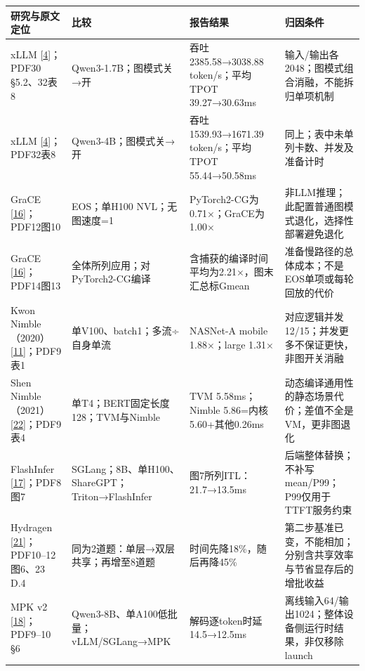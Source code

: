 \documentclass[
  11pt,
  UTF8]{ctexart}
\begin{document}
\begin{longtable}[]{@{}
  >{\raggedright\arraybackslash}p{}
  >{\raggedright\arraybackslash}p{}
  >{\raggedright\arraybackslash}p{}
  >{\raggedright\arraybackslash}p{}@{}}
\toprule
研究与原文定位 & 比较 & 报告结果 & 归因条件 \\
\midrule
\endhead
xLLM {[}\protect\hyperlink{ref-liu2025xllm}{4}{]}；PDF30 §5.2、32表8 &
Qwen3-1.7B；图模式关→开 & 吞吐2385.58→3038.88 token/s；平均TPOT
39.27→30.63ms & 输入/输出各2048；图模式组合消融，不能拆归单项机制 \\
xLLM {[}\protect\hyperlink{ref-liu2025xllm}{4}{]}；PDF32表8 &
Qwen3-4B；图模式关→开 & 吞吐1539.93→1671.39 token/s；平均TPOT
55.44→50.58ms & 同上；表中未单列卡数、并发及准备计时 \\
GraCE {[}\protect\hyperlink{ref-ghosh2026grace}{16}{]}；PDF12图10 &
EOS；单H100 NVL；无图速度=1 & PyTorch2-CG为0.71×；GraCE为1.00× &
非LLM推理；此配置普通图模式退化，选择性部署避免退化 \\
GraCE {[}\protect\hyperlink{ref-ghosh2026grace}{16}{]}；PDF14图13 &
全体所列应用；对PyTorch2-CG编译 &
含捕获的编译时间平均为2.21×，图末汇总标Gmean &
准备慢路径的总体成本；不是EOS单项或每轮回放的代价 \\
Kwon
Nimble（2020）{[}\protect\hyperlink{ref-kwon2020nimble}{11}{]}；PDF9表1
& 单V100、batch1；多流÷自身单流 & NASNet-A mobile 1.88×；large 1.31× &
对应逻辑并发12/15；并发更多不保证更快，非图开关消融 \\
Shen
Nimble（2021）{[}\protect\hyperlink{ref-shen2021nimble}{22}{]}；PDF9表4
& 单T4；BERT固定长度128；TVM与Nimble & TVM 5.58ms；Nimble
5.86=内核5.60+其他0.26ms &
动态编译通用性的静态场景代价；差值不全是VM，更非图退化 \\
FlashInfer {[}\protect\hyperlink{ref-ye2025flashinfer}{17}{]}；PDF8图7 &
SGLang；8B、单H100、ShareGPT；Triton→FlashInfer &
图7所列ITL：21.7→13.5ms &
后端整体替换；不补写mean/P99；P99仅用于TTFT服务约束 \\
Hydragen
{[}\protect\hyperlink{ref-juravsky2024hydragen}{21}{]}；PDF10--12图6、23
D.4 & 同为2道题：单层→双层共享；再增至8道题 & 时间先降18\%，随后再降45\%
& 第二步基准已变，不能相加；分别含共享效率与节省显存后的增批收益 \\
MPK v2 {[}\protect\hyperlink{ref-cheng2026mpk}{18}{]}；PDF9--10 §6 &
Qwen3-8B、单A100低批量；vLLM/SGLang→MPK & 解码逐token时延14.5→12.5ms &
离线输入64/输出1024；整体设备侧运行时结果，非仅移除launch \\

\end{longtable}
\end{document}
